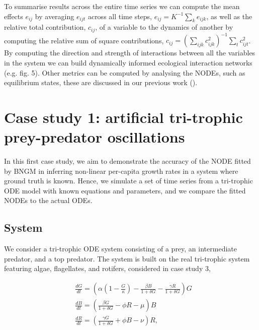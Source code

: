 \documentclass[11pt, oneside]{article}
\begin{document}
To summarise results across the entire time series we can compute the mean effects $e_{ij}$ by averaging $e_{ijt}$ across all time steps, $e_{ij} = K^{-1} \sum_k e_{ijk}$, as well as the relative total contribution, $c_{ij}$, of a variable to the dynamics of another by computing the relative sum of square contributions, $c_{ij} = \left( \sum_{ijk} c_{ijk}^{2} \right)^{-1} \sum_t c_{ijt}^2$. 
By computing the direction and strength of interactions between all the variables in the system we can build dynamically informed ecological interaction networks (e.g. fig. 5).
Other metrics can be computed by analysing the NODEs, such as equilibrium states, these are discussed in our previous work (\cite{Bonnaffe2021a}). 

\section{Case study 1: artificial tri-trophic prey-predator oscillations}

In this first case study, we aim to demonstrate the accuracy of the NODE fitted by BNGM in inferring non-linear per-capita growth rates in a system where ground truth is known.
Hence, we simulate a set of time series from a tri-trophic ODE model with known equations and parameters, and we compare the fitted NODEs to the actual ODEs.

\subsection{System}

We consider a tri-trophic ODE system consisting of a prey, an intermediate predator, and a top predator.
The system is built on the real tri-trophic system featuring algae, flagellates, and rotifers, considered in case study 3,

\vspace{-0.5cm}
\begin{equation} \begin{aligned}
    & \frac{dG}{dt} = \left( \alpha \left(1-\frac{G}{\kappa}\right) - \frac{\beta B}{1+\delta G} - \frac{\gamma R}{1+\delta G} \right) G\\
    & \frac{dB}{dt} = \left( \frac{\beta G}{1+\delta G} - \phi R - \mu \right) B \\
	& \frac{dR}{dt} = \left( \frac{\gamma G}{1+\delta G} + \phi B - \nu \right) R,
\end{aligned} \end{equation}
\end{document}
